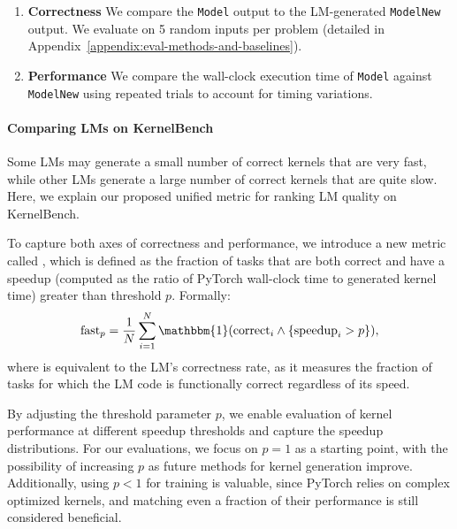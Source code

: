 \begin{enumerate}[itemsep=0.1pt,topsep=0pt,leftmargin=*]
    \item \textbf{Correctness} 
    We compare the \texttt{Model} output to the LM-generated \texttt{ModelNew} output. 
    We evaluate on 5 random inputs per problem (detailed in Appendix~\ref{appendix:eval-methods-and-baselines}).
    \item \textbf{Performance} We compare the wall-clock execution time of \texttt{Model} against \texttt{ModelNew} using repeated trials to account for timing variations. 
\end{enumerate}

\paragraph{Comparing LMs on KernelBench}
Some LMs may generate a small number of correct kernels that are very fast, while other LMs generate a large number of correct kernels that are quite slow. Here, we explain our proposed unified metric for ranking LM quality on KernelBench. 

To capture both axes of correctness and performance, we introduce a new metric called , which is defined as the fraction of tasks that are both correct and have a speedup (computed as the ratio of PyTorch wall-clock time to generated kernel time) greater than threshold $p$. Formally:
\begin{align*}
\text{fast}_p = \frac{1}{N} \sum_{i=1}^N \mathbbm{1}(\text{correct}_i \land \left\{ \text{speedup}_i > p \right \}),
\vspace{-.1in}
\end{align*} 
where  is equivalent to the LM's correctness rate, as it measures the fraction of tasks for which the LM code is functionally correct regardless of its speed.

By adjusting the threshold parameter $p$, we enable evaluation of kernel performance at different speedup thresholds and capture the speedup distributions. For our evaluations, we focus on $p=1$ as a starting point, with the possibility of increasing $p$ as future methods for kernel generation improve. Additionally, using $p<1$ for training is valuable, since PyTorch relies on complex optimized kernels, and matching even a fraction of their performance is still considered beneficial.